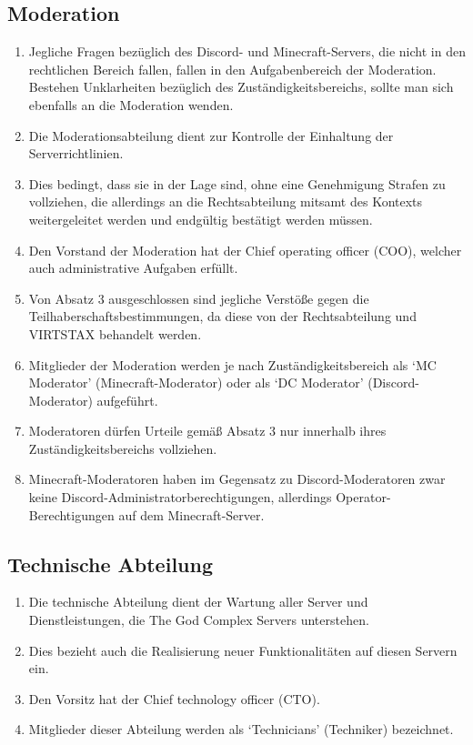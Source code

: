 \documentclass{article}
\begin{document}
\subsection{Moderation}\label{support}
\begin{enumerate}[(1)]
	\item Jegliche Fragen bezüglich des Discord- und Minecraft-Servers, die nicht in den rechtlichen Bereich fallen, fallen in den Aufgabenbereich der Moderation. Bestehen Unklarheiten bezüglich des Zuständigkeitsbereichs, sollte man sich ebenfalls an die Moderation wenden.
	\item Die Moderationsabteilung dient zur Kontrolle der Einhaltung der Serverrichtlinien.
	\item Dies bedingt, dass sie in der Lage sind, ohne eine Genehmigung Strafen zu vollziehen, die allerdings an die Rechtsabteilung mitsamt des Kontexts weitergeleitet werden und endgültig bestätigt werden müssen.
	\item Den Vorstand der Moderation hat der Chief operating officer (COO), welcher auch administrative Aufgaben erfüllt.
	\item Von Absatz 3 ausgeschlossen sind jegliche Verstöße gegen die Teilhaberschaftsbestimmungen, da diese von der Rechtsabteilung und VIRTSTAX behandelt werden.
	\item Mitglieder der Moderation werden je nach Zuständigkeitsbereich als `MC Moderator' (Minecraft-Moderator) oder als `DC Moderator' (Discord-Moderator) aufgeführt.
	\item Moderatoren dürfen Urteile gemäß Absatz 3 nur innerhalb ihres Zuständigkeitsbereichs vollziehen.
	\item Minecraft-Moderatoren haben im Gegensatz zu Discord-Moderatoren zwar keine Discord-Administratorberechtigungen, allerdings Operator-Berechtigungen auf dem Minecraft-Server.
\end{enumerate}

\subsection{Technische Abteilung}
\begin{enumerate}[(1)]
	\item Die technische Abteilung dient der Wartung aller Server und Dienstleistungen, die The God Complex Servers unterstehen.
	\item Dies bezieht auch die Realisierung neuer Funktionalitäten auf diesen Servern ein.
	\item Den Vorsitz hat der Chief technology officer (CTO).
	\item Mitglieder dieser Abteilung werden als `Technicians' (Techniker) bezeichnet.
\end{enumerate}
\end{document}
